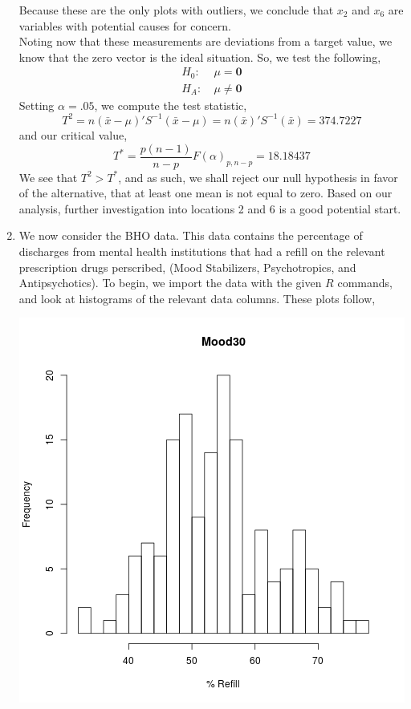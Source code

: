 \documentclass[letterpaper,10pt]{article}
\begin{document}
\begin{enumerate}
\begin{center}
\end{center}
Because these are the only plots with outliers, we conclude that $x_2$ and $x_6$ are variables with potential causes for concern.\\
Noting now that these measurements are deviations from a target value, we know that the zero vector is the ideal situation. So, we test the following,
\begin{align*}
H_0:\ & \mu=\textbf{0}\\
H_A:\ & \mu\neq\textbf{0}
\end{align*}
Setting $\alpha=.05$, we compute the test statistic,
\[T^2=n(\bar{x}-\mu)'S^{-1}(\bar{x}-\mu)=n(\bar{x})'S^{-1}(\bar{x})=374.7227\]
and our critical value,
\[T^*=\frac{p(n-1)}{n-p}F(\alpha)_{p,n-p}=18.18437\]
We see that $T^2>T^*$, and as such, we shall reject our null hypothesis in favor of the alternative, that at least one mean is not equal to zero. Based on our analysis, further investigation into locations 2 and 6 is a good potential start.
\item We now consider the BHO data. This data contains the percentage of discharges from mental health institutions that had a refill on the relevant prescription drugs perscribed, (Mood Stabilizers, Psychotropics, and Antipsychotics). To begin, we import the data with the given $R$ commands, and look at histograms of the relevant data columns. These plots follow,
\begin{center}
\includegraphics[scale=.33]{moodhist.png}

\end{center}
\end{enumerate}
\end{document}
